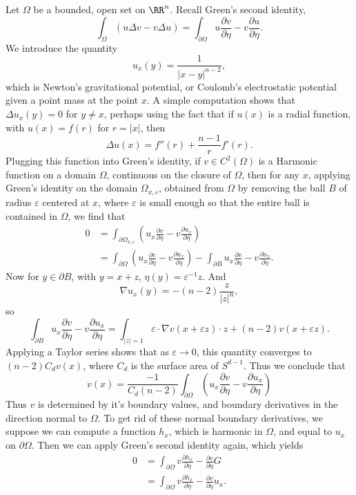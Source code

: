 Let $\Omega$ be a bounded, open set on $\RR^n$. Recall Green's second identity,
%
\[ \int_\Omega (u \Delta v - v \Delta u) = \int_{\partial \Omega} u \frac{\partial v}{\partial \eta} - v \frac{\partial u}{\partial \eta}. \]
%
We introduce the quantity
%
\[ u_x(y) = \frac{1}{|x - y|^{n-2}}, \]
%
which is Newton's gravitational potential, or Coulomb's electrostatic potential given a point mass at the point $x$. A simple computation shows that $\Delta u_x(y) = 0$ for $y \neq x$, perhaps using the fact that if $u(x)$ is a radial function, with $u(x) = f(r)$ for $r = |x|$, then
%
\[ \Delta u(x) = f''(r) + \frac{n - 1}{r} f'(r). \]
%
Plugging this function into Green's identity, if $v \in C^2(\Omega)$ is a Harmonic function on a domain $\Omega$, continuous on the closure of $\Omega$, then for any $x$, applying Green's identity on the domain $\Omega_{x,\varepsilon}$, obtained from $\Omega$ by removing the ball $B$ of radius $\varepsilon$ centered at $x$, where $\varepsilon$ is small enough so that the entire ball is contained in $\Omega$, we find that
%
\begin{align*}
	0 &= \int_{\partial \Omega_{x,\varepsilon}} \left( u_x \frac{\partial v}{\partial \eta} - v \frac{\partial u_x}{\partial \eta} \right)\\
	&= \int_{\partial \Omega} \left( u_x \frac{\partial v}{\partial \eta} - v \frac{\partial u_x}{\partial \eta} \right) - \int_{\partial B} u_x \frac{\partial v}{\partial \eta} - v \frac{\partial u_x}{\partial \eta}.
\end{align*}
%
Now for $y \in \partial B$, with $y = x + z$, $\eta(y) = \varepsilon^{-1} z$. And
%
\[ \nabla u_x(y) = -(n-2) \frac{z}{|z|^n}, \]
%
so
%
\[ \int_{\partial B} u_x \frac{\partial v}{\partial \eta} - v \frac{\partial u_x}{\partial \eta} = \int_{|z| = 1} \varepsilon \cdot \nabla v(x + \varepsilon z) \cdot z + (n-2) v(x + \varepsilon z). \]
%
Applying a Taylor series shows that as $\varepsilon \to 0$, this quantity converges to $(n-2) C_d v(x)$, where $C_d$ is the surface area of $S^{d-1}$. Thus we conclude that
%
\[ v(x) = \frac{-1}{C_d (n-2)} \int_{\partial \Omega} \left( u_x \frac{\partial v}{\partial \eta} - v \frac{\partial u_x}{\partial \eta} \right) \]
%
Thus $v$ is determined by it's boundary values, and boundary derivatives in the direction normal to $\Omega$. To get rid of these normal boundary derivatives, we suppose we can compute a function $h_x$, which is harmonic in $\Omega$, and equal to $u_x$ on $\partial \Omega$. Then we can apply Green's second identity again, which yields
%
\begin{align*}
	0 &= \int_{\partial \Omega} v \frac{\partial h_x}{\partial \eta} - \frac{\partial v}{\partial \eta} G\\
	&= \int_{\partial \Omega} v \frac{\partial h_x}{\partial \eta} - \frac{\partial v}{\partial \eta} u_x.
\end{align*}
